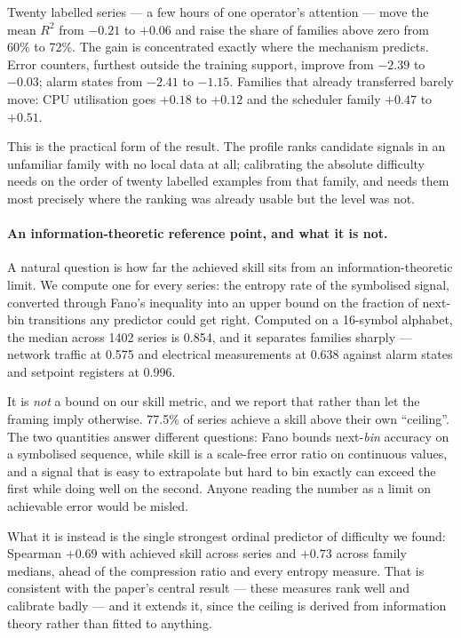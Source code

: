 \documentclass[11pt,a4paper]{article}
\newcommand{\num}[1]{#1}
\begin{document}
Twenty labelled series --- a few hours of one operator's attention --- move the
mean \(R^2\) from \(-0.21\) to \(+0.06\) and raise the share of families
above zero from \num{60}\% to \num{72}\%. The gain is concentrated exactly
where the mechanism predicts. Error counters, furthest outside the training
support, improve from \(-2.39\) to \(-0.03\); alarm states from \(-2.41\) to
\(-1.15\). Families that already transferred barely move: CPU utilisation goes
\(+0.18\) to \(+0.12\) and the scheduler family \(+0.47\) to \(+0.51\).

This is the practical form of the result. The profile ranks candidate signals in
an unfamiliar family with no local data at all; calibrating the absolute
difficulty needs on the order of twenty labelled examples from that family, and
needs them most precisely where the ranking was already usable but the level was
not.

\paragraph{An information-theoretic reference point, and what it is not.} A
natural question is how far the achieved skill sits from an information-theoretic
limit. We compute one for every series: the entropy rate of the symbolised
signal, converted through Fano's inequality into an upper bound on the fraction
of next-bin transitions any predictor could get right. Computed on a 16-symbol alphabet, the median across
\num{1402} series is \num{0.854}, and it separates families sharply --- network
traffic at \num{0.575} and electrical measurements at \num{0.638} against alarm
states and setpoint registers at \num{0.996}.

It is \emph{not} a bound on our skill metric, and we report that rather than
let the framing imply otherwise. \num{77.5}\% of series achieve a skill above
their own ``ceiling''. The two quantities answer different questions: Fano
bounds next-\emph{bin} accuracy on a symbolised sequence, while skill is a
scale-free error ratio on continuous values, and a signal that is easy to
extrapolate but hard to bin exactly can exceed the first while doing well on the
second. Anyone reading the number as a limit on achievable error would be
misled.

What it is instead is the single strongest ordinal predictor of difficulty we
found: Spearman \(+0.69\) with achieved skill across series and \(+0.73\)
across family medians, ahead of the compression ratio and every entropy measure.
That is consistent with the paper's central result --- these measures rank well
and calibrate badly --- and it extends it, since the ceiling is derived from
information theory rather than fitted to anything.
\end{document}
